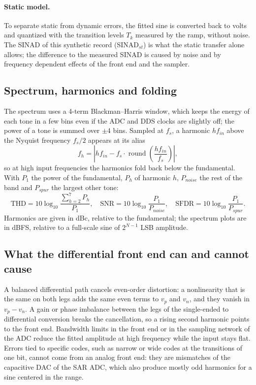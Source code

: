 \paragraph{Static model.} To separate static from dynamic errors, the fitted sine is converted back
to volts and quantized with the transition levels $T_k$ measured by the ramp, without noise. The
SINAD of this synthetic record (SINAD$_{st}$) is what the static transfer alone allows; the
difference to the measured SINAD is caused by noise and by frequency dependent effects of the
front end and the sampler.

\subsection{Spectrum, harmonics and folding}
The spectrum uses a 4-term Blackman--Harris window, which keeps the energy of each tone in a few
bins even if the ADC and DDS clocks are slightly off; the power of a tone is summed over $\pm 4$
bins. Sampled at $f_s$, a harmonic $h f_{in}$ above the Nyquist frequency $f_s/2$ appears at its
alias
\begin{equation}
f_h = \left| h f_{in} - f_s \cdot \operatorname{round}\!\left(\frac{h f_{in}}{f_s}\right) \right|,
\end{equation}
so at high input frequencies the harmonics fold back below the fundamental. With $P_1$ the power of
the fundamental, $P_h$ of harmonic $h$, $P_{noise}$ the rest of the band and $P_{spur}$ the largest
other tone:
\begin{equation}
\text{THD} = 10\log_{10}\frac{\sum_{h=2}^{7} P_h}{P_1}, \quad
\text{SNR} = 10\log_{10}\frac{P_1}{P_{noise}}, \quad
\text{SFDR} = 10\log_{10}\frac{P_1}{P_{spur}}.
\end{equation}
Harmonics are given in dBc, relative to the fundamental; the spectrum plots are in dBFS, relative to
a full-scale sine of $2^{N-1}$ LSB amplitude.

\subsection{What the differential front end can and cannot cause}
A balanced differential path cancels even-order distortion: a nonlinearity that is the same on both
legs adds the same even terms to $v_p$ and $v_n$, and they vanish in $v_p - v_n$. A gain or phase
imbalance between the legs of the single-ended to differential conversion breaks the cancellation,
so a rising second harmonic points to the front end. Bandwidth limits in the front end or in the
sampling network of the ADC reduce the fitted amplitude at high frequency while the input stays
flat. Errors tied to specific codes, such as narrow or wide codes at the transitions of one bit,
cannot come from an analog front end: they are mismatches of the capacitive DAC of the SAR ADC,
which also produce mostly odd harmonics for a sine centered in the range.
